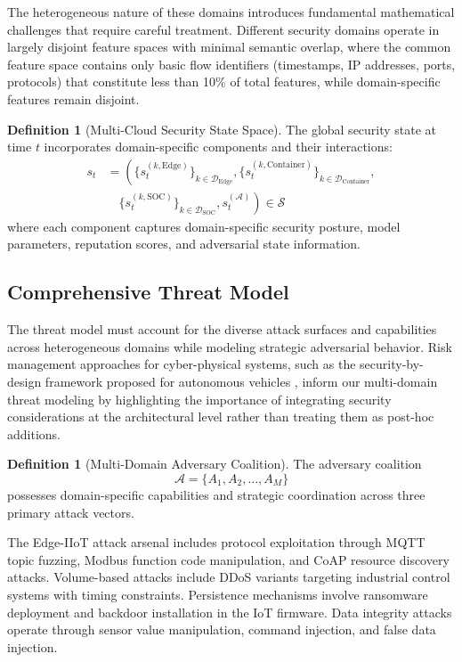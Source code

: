 \documentclass[12pt,a4paper]{article}
\theoremstyle{definition}
\newtheorem{definition}[theorem]{Definition}
\newcommand{\A}{\mathcal{A}}
\begin{document}
The heterogeneous nature of these domains introduces fundamental mathematical challenges that require careful treatment. Different security domains operate in largely disjoint feature spaces with minimal semantic overlap, where the common feature space contains only basic flow identifiers (timestamps, IP addresses, ports, protocols) that constitute less than 10\% of total features, while domain-specific features remain disjoint.

\begin{definition}[Multi-Cloud Security State Space]
\label{def:state_space}
The global security state at time $t$ incorporates domain-specific components and their interactions:
\begin{align}
s_t &= \left(\{s_t^{(k,\text{Edge})}\}_{k \in \mathcal{D}_{\text{Edge}}}, \{s_t^{(k,\text{Container})}\}_{k \in \mathcal{D}_{\text{Container}}}, \right. \nonumber\\
&\quad \left. \{s_t^{(k,\text{SOC})}\}_{k \in \mathcal{D}_{\text{SOC}}}, s_t^{(\mathcal{A})}\right) \in \mathcal{S}
\end{align}
where each component captures domain-specific security posture, model parameters, reputation scores, and adversarial state information.
\end{definition}

\subsection{Comprehensive Threat Model}

The threat model must account for the diverse attack surfaces and capabilities across heterogeneous domains while modeling strategic adversarial behavior. Risk management approaches for cyber-physical systems, such as the security-by-design framework proposed for autonomous vehicles \cite{abdelbasset2021security}, inform our multi-domain threat modeling by highlighting the importance of integrating security considerations at the architectural level rather than treating them as post-hoc additions.

\begin{definition}[Multi-Domain Adversary Coalition]
\label{def:adversary_coalition}
The adversary coalition
\[
\A = \{A_1, A_2, \ldots, A_M\}
\]
possesses domain-specific capabilities and strategic coordination across three primary attack vectors.
\end{definition}

The Edge-IIoT attack arsenal includes protocol exploitation through MQTT topic fuzzing, Modbus function code manipulation, and CoAP resource discovery attacks. Volume-based attacks include DDoS variants targeting industrial control systems with timing constraints. Persistence mechanisms involve ransomware deployment and backdoor installation in the IoT firmware. Data integrity attacks operate through sensor value manipulation, command injection, and false data injection.
\end{document}
